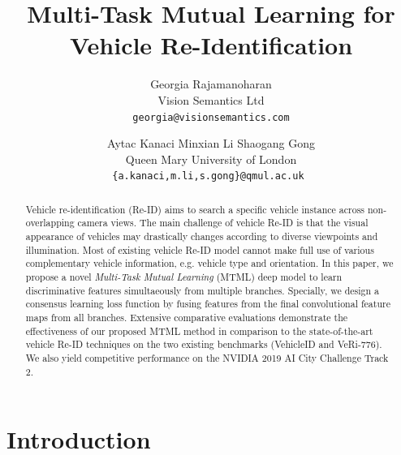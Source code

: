 \documentclass[10pt,twocolumn,letterpaper]{article}
\begin{document}
\title{Multi-Task Mutual Learning for Vehicle Re-Identification}

\author{Georgia Rajamanoharan\\
Vision Semantics Ltd\\
{\tt\small georgia@visionsemantics.com}
\and
Aytac Kanaci \hspace{0.7cm}
Minxian Li  \hspace{0.7cm}
Shaogang Gong\\
Queen Mary University of London\\
{\tt\small \{a.kanaci,m.li,s.gong\}@qmul.ac.uk }
}

\maketitle

\begin{abstract}
Vehicle re-identification (Re-ID) aims to search a specific vehicle
instance across non-overlapping camera views.
%
The main challenge of vehicle Re-ID is that
the visual appearance of vehicles may drastically changes
according to diverse viewpoints and illumination.
%
Most of existing vehicle Re-ID model cannot make full use of
various complementary vehicle information, e.g. vehicle type and orientation.
%
In this paper, we propose a novel {\em Multi-Task Mutual Learning} (MTML) deep model
to learn discriminative features simultaeously from multiple branches.
%
Specially, we design a consensus learning loss function by fusing features from the final convolutional feature maps from all branches.
%
Extensive comparative evaluations demonstrate the effectiveness of our
proposed MTML method in comparison to the state-of-the-art vehicle Re-ID techniques on the two existing benchmarks
(VehicleID and VeRi-776).
We also yield competitive performance on the NVIDIA 2019 AI City Challenge Track 2.
\end{abstract}

\section{Introduction}
\end{document}
